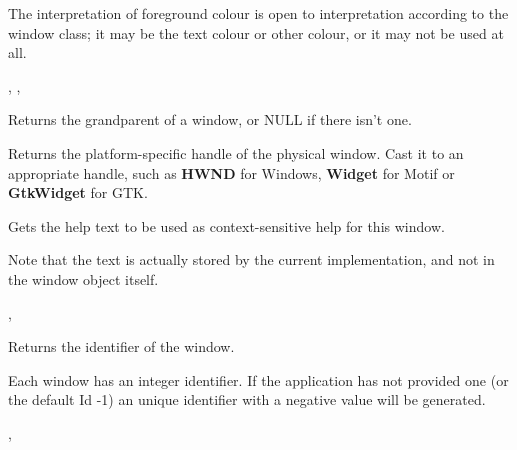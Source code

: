 The interpretation of foreground colour is open to interpretation according
to the window class; it may be the text colour or other colour, or it may not
be used at all.


,\rtfsp
{},\rtfsp
{}



Returns the grandparent of a window, or NULL if there isn't one.

\label{wxwindowgethandle}


Returns the platform-specific handle of the physical window. Cast it to an appropriate
handle, such as {\bf HWND} for Windows, {\bf Widget} for Motif or {\bf GtkWidget} for GTK.


\label{wxwindowgethelptext}


Gets the help text to be used as context-sensitive help for this window.

Note that the text is actually stored by the current  implementation,
and not in the window object itself.


, 

\label{wxwindowgetid}


Returns the identifier of the window.


Each window has an integer identifier. If the application has not provided one
(or the default Id -1) an unique identifier with a negative value will be generated.


,\rtfsp
{}

